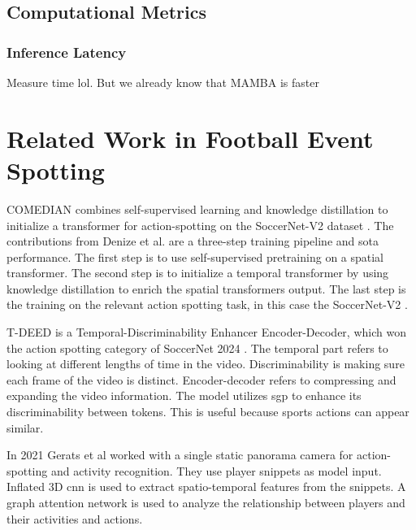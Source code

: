 \subsection{Computational Metrics} 
\subsubsection{Inference Latency} 
Measure time lol. But we already know that MAMBA is faster 

\section{Related Work in Football Event Spotting}
\label{sec:fw_work}

COMEDIAN \cite{denize_comedian_2024} combines self-supervised learning and knowledge distillation to initialize a transformer for action-spotting on the SoccerNet-V2 dataset \cite{deliege_soccernet-v2_dataset_2021}. The contributions from Denize et al. are a three-step training pipeline and \acrshort{sota} performance. The first step is to use self-supervised pretraining on a spatial transformer. The second step is to initialize a temporal transformer by using knowledge distillation to enrich the spatial transformers output. The last step is the training on the relevant action spotting task, in this case the SoccerNet-V2 \cite{deliege_soccernet-v2_dataset_2021}.

T-DEED \cite{xarles_t-deed_2024} is a Temporal-Discriminability Enhancer Encoder-Decoder, which won the action spotting category of SoccerNet 2024 \cite{cioppa_soccernet_2024}. The temporal part refers to looking at different lengths of time in the video. Discriminability is making sure each frame of the video is distinct. Encoder-decoder refers to compressing and expanding the video information. The model utilizes \acrfull{sgp} to enhance its discriminability between tokens. This is useful because sports actions can appear similar. 

In 2021 Gerats et al\cite{gerats_individual_same_task_2021} worked with a single static panorama camera for action-spotting and activity recognition. They use player snippets as model input. Inflated 3D \acrshort{cnn} is used to extract spatio-temporal features from the snippets. A graph attention network is used to analyze the relationship between players and their activities and actions. 
